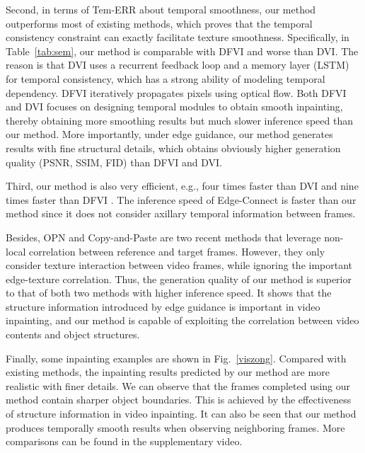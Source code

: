 {\color{blue}
Second, in terms of Tem-ERR about temporal smoothness, our method outperforms most of existing methods, which proves that the temporal consistency constraint can exactly facilitate texture smoothness.
Specifically, in Table~\ref{tab:sem}, our method is comparable with DFVI and worse than DVI.
The reason is that DVI uses a recurrent feedback loop and a memory layer (LSTM) for temporal consistency, which has a strong ability of modeling temporal dependency. DFVI iteratively propagates pixels using optical flow. Both DFVI and DVI focuses on designing temporal modules to obtain smooth inpainting, thereby obtaining more smoothing results but much slower inference speed than our method. More importantly, under edge guidance, our method generates results with fine structural details, which obtains obviously higher generation quality (PSNR, SSIM, FID) than DFVI and DVI.
}

Third, our method is also very efficient, e.g., four times faster than DVI \cite{Kim_2019_CVPR1} and nine times faster than DFVI \cite{Xu_2019_CVPR}. 
The inference speed of Edge-Connect is faster than our method since it does not consider axillary temporal information between frames. 



{\color{blue} Besides, OPN \cite{oh2019onion} and Copy-and-Paste \cite{lee2019copy} are two recent methods that leverage non-local correlation between reference and target frames.
However, they only consider texture interaction between video frames, while ignoring the important edge-texture correlation.
Thus, the generation quality of our method is superior to that of both two methods with higher inference speed. It shows that the structure information introduced by edge guidance is important in video inpainting, and our method is capable of exploiting the correlation between video contents and object structures. }
%

Finally, some inpainting examples are shown in Fig.~\ref{viszong}.
Compared with existing methods, the inpainting results predicted by our method are more realistic with finer details. 
We can observe that the frames completed using our method contain sharper object boundaries. This is achieved by the effectiveness of structure information in video inpainting.
%
It can also be seen that our method produces temporally smooth results when observing neighboring frames. More comparisons can be found in the supplementary video. 


